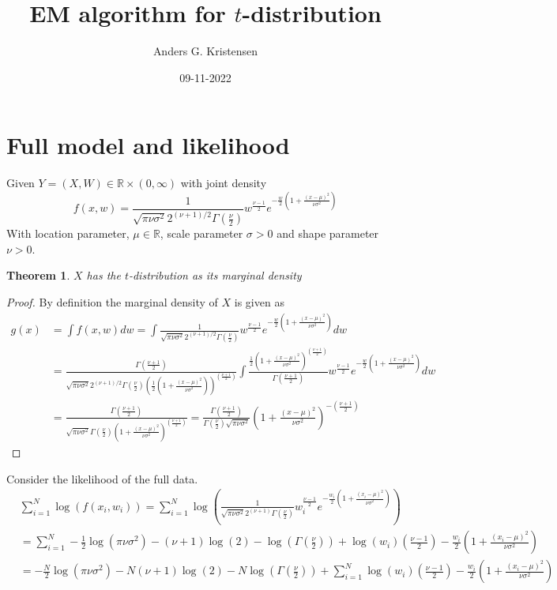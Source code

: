 \documentclass[a4paper, 11 pt]{article}
\title{EM algorithm for $t$-distribution}
\author{Anders G. Kristensen}
\date{09-11-2022}
\newtheorem{theorem}{Theorem}[section]
\begin{document}
\maketitle
\section{Full model and likelihood}
\noindent Given $Y = (X,W)\in\mathbb{R} \times (0,\infty)$ with joint density 
\[
    f(x,w) = \frac{1}{\sqrt{\pi\nu\sigma^2}2^{(\nu+1)/2}\Gamma(\frac{\nu}{2})}w^{\frac{\nu-1}{2}}e^{-\frac{w}{2}\left(1+\frac{(x-\mu)^2}{\nu\sigma^2}\right)}
\]
With location parameter, $\mu\in\mathbb{R}$, scale parameter $\sigma>0$ and shape parameter $\nu>0$. 
\begin{theorem}
    $X$ has the $t$-distribution as its marginal density
\end{theorem}
\begin{proof}
    By definition the marginal density of $X$ is given as
    \begin{align*}
        g(x) &= \int f(x,w) dw = \int \frac{1}{\sqrt{\pi\nu\sigma^2}2^{(\nu+1)/2}\Gamma(\frac{\nu}{2})}w^{\frac{\nu-1}{2}}e^{-\frac{w}{2}\left(1+\frac{(x-\mu)^2}{\nu\sigma^2}\right)} dw \\
        &= \frac{\Gamma(\frac{\nu+1}{2})}{\sqrt{\pi\nu\sigma^2}2^{(\nu+1)/2}\Gamma(\frac{\nu}{2})\left(\frac{1}{2}\left(1+\frac{(x-\mu)^2}{\nu\sigma^2}\right)\right)^{(\frac{\nu+1}{2})}} \int \frac{\frac{1}{2}\left(1+\frac{(x-\mu)^2}{\nu\sigma^2}\right)^{(\frac{\nu+1}{2})}}{\Gamma(\frac{\nu+1}{2})} w^{\frac{\nu-1}{2}}e^{-\frac{w}{2}\left(1+\frac{(x-\mu)^2}{\nu\sigma^2}\right)}dw\\
        &= \frac{\Gamma(\frac{\nu+1}{2})}{\sqrt{\pi\nu\sigma^2}\Gamma(\frac{\nu}{2})\left(1+\frac{(x-\mu)^2}{\nu\sigma^2}\right)^{(\frac{\nu+1}{2})}} = \frac{\Gamma(\frac{\nu+1}{2})}{\Gamma(\frac{\nu}{2})\sqrt{\pi\nu\sigma^2}}\left(1+\frac{(x-\mu)^2}{\nu\sigma^2}\right)^{-\left(\frac{\nu+1}{2}\right)}
    \end{align*}
\end{proof}
\noindent Consider the likelihood of the full data.
\begin{align*}
    &\sum_{i = 1}^N \log\left(f(x_i,w_i)\right) = \sum_{i = 1}^N \log\left(\frac{1}{\sqrt{\pi\nu\sigma^2}2^{(\nu+1)}\Gamma(\frac{\nu}{2})}w_i^{\frac{\nu-1}{2}}e^{-\frac{w_i}{2}\left(1+\frac{(x_i-\mu)^2}{\nu\sigma^2}\right)}\right) \\
    &= \sum_{i = 1}^N -\frac{1}{2}\log\left(\pi\nu\sigma^2\right) - \left(\nu+1\right)\log\left(2\right)-\log\left(\Gamma\left(\frac{\nu}{2}\right)\right) + \log\left(w_i\right)\left(\frac{\nu-1}{2}\right)-\frac{w_i}{2}\left(1+\frac{(x_i-\mu)^2}{\nu\sigma^2}\right) \\
    &= -\frac{N}{2}\log\left(\pi\nu\sigma^2\right) - N\left(\nu+1\right)\log\left(2\right)-N\log\left(\Gamma\left(\frac{\nu}{2}\right)\right) + \sum_{i = 1}^N \log\left(w_i\right)\left(\frac{\nu-1}{2}\right)-\frac{w_i}{2}\left(1+\frac{(x_i-\mu)^2}{\nu\sigma^2}\right)
\end{align*}
\end{document}
